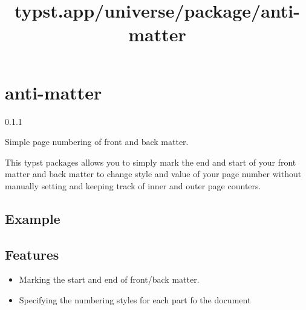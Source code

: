 \title{typst.app/universe/package/anti-matter}

\label{banner}
\section{anti-matter}\label{anti-matter}

{ 0.1.1 }

Simple page numbering of front and back matter.

\label{readme}
This typst packages allows you to simply mark the end and start of your
front matter and back matter to change style and value of your page
number without manually setting and keeping track of inner and outer
page counters.

\subsection{Example}\label{example}

\begin{Shaded}
\begin{Highlighting}[]






\end{Highlighting}
\end{Shaded}


\subsection{Features}\label{features}

\begin{itemize}
\tightlist
\item
  Marking the start and end of front/back matter.
\item
  Specifying the numbering styles for each part fo the document
\end{itemize}

